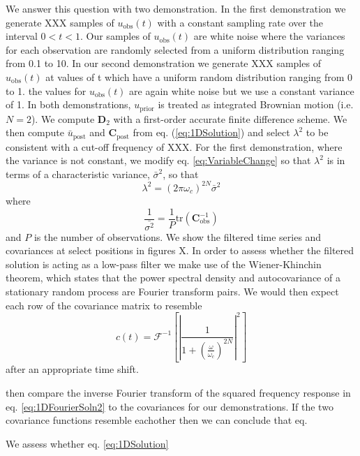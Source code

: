 \documentclass[10pt,a4paper]{article}
\begin{document}
We answer this question with two demonstration.  In the first demonstration we generate XXX samples of $u_\mathrm{obs}(t)$ with a constant sampling rate over the interval $0<t<1$.  Our samples of $u_\mathrm{obs}(t)$ are white noise where the variances for each observation are randomly selected from a uniform distribution ranging from 0.1 to 10.  In our second demonstration we generate XXX samples of $u_\mathrm{obs}(t)$ at values of t which have a uniform random distribution ranging from 0 to 1. the values for $u_\mathrm{obs}(t)$ are again white noise but we use a constant variance of 1.  In both demonstrations, $u_\mathrm{prior}$ is treated as integrated Brownian motion (i.e. $N=2$).  We compute $\mathbf{D}_2$ with a first-order accurate finite difference scheme. We then compute $\bar{u}_\mathrm{post}$ and $\mathbf{C}_\mathrm{post}$ from eq. (\ref{eq:1DSolution}) and select $\lambda^2$ to be consistent with a cut-off frequency of XXX.  For the first demonstration, where the variance is not constant, we modify eq. \ref{eq:VariableChange} so that $\lambda^2$ is in terms of a characteristic variance, $\bar{\sigma}^2$, so that
\begin{equation}
\lambda^2 = (2\pi\omega_c)^{2N}\bar{\sigma}^2
\end{equation}
where
\begin{equation}
\frac{1}{\bar{\sigma^2}} = \frac{1}{P} \mathrm{tr}\left(\mathbf{C}_\mathrm{obs}^{-1}\right)
\end{equation}
and $P$ is the number of observations.  We show the filtered time series and covariances at select positions in figures X.  In order to assess whether the filtered solution is acting as a low-pass filter we make use of the Wiener-Khinchin theorem, which states that the power spectral density and autocovariance of a stationary random process are Fourier transform pairs. We would then expect each row of the covariance matrix to resemble 
\begin{equation}
c(t) = \mathcal{F}^{-1}\left[ \left|\frac{1}{1 + \left(\frac{\omega}{\omega_c}\right)^{2N}}\right|^2\right]
\end{equation}
after an appropriate time shift.

then compare the inverse Fourier transform of the squared frequency response in eq. \ref{eq:1DFourierSoln2} to the covariances for our demonstrations.  If the two covariance functions resemble eachother then we can conclude that eq. 
    
We assess whether eq. \ref{eq:1DSolution}    
\end{document}
